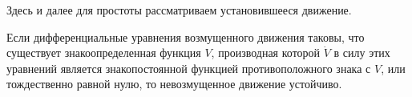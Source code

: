 

Здесь и далее для простоты рассматриваем установившееся движение.

\begin{to_thr}
    Если дифференциальные уравнения возмущенного движения таковы, что существует знакоопределенная функция $V$, производная которой $\dot{V}$ в силу этих уравнений является знакопостоянной функцией противоположного знака с $V$, или тождественно равной нулю, то невозмущенное движение устойчиво.
\end{to_thr}









